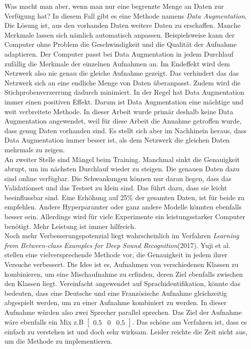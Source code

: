 Was macht man aber, wenn man nur eine begrenzte Menge an Daten zur Verfügung hat? In diesem Fall gibt es eine Methode namens \textit{Data Augmentation}. Die Lösung ist, aus den vorhanden Daten weitere Daten zu erschaffen. Manche Merkmale lassen sich nämlich automatisch anpassen. Beispielsweise kann der Computer ohne Problem die Geschwindigkeit und die Qualität der Aufnahme adaptieren. Der Computer passt bei Data Augmentation in jedem Durchlauf zufällig die Merkmale der einzelnen Aufnahmen an. Im Endeffekt wird dem Netzwerk also nie genau die gleiche Aufnahme gezeigt. Das verhindert das das Netzwerk sich an eine endliche Menge von Daten überanpasst. Zudem wird die Stichprobenverzerrung dadurch minimiert. In der Regel hat Data Augmentation immer einen positiven Effekt. Darum ist Data Augmentation  eine mächtige und weit verbreitete Methode.  In dieser Arbeit wurde primär deshalb keine Data Augmentation angewendet, weil für diese Arbeit die Annahme getroffen wurde, dass genug Daten vorhanden sind. Es stellt sich aber im Nachhinein heraus, dass Data Augmentation immer besser ist, als dem Netzwerk die gleichen Daten mehrmals zu zeigen. 
\\
An zweiter Stelle sind Mängel beim Training. Manchmal sinkt die Genauigkeit abrupt, um im nächsten Durchlauf wieder zu steigen. Die genauen Daten dazu sind online verfügbar. Die Schwankungen können nur daran liegen, dass das Validationset und das Testset zu klein sind. Das führt dazu, dass sie leicht beeinflussbar sind. Eine Erhöhung auf 25\% der gesamten Daten, ist für beide zu empfehlen. Andere Hyperparamter oder ganz andere Modelle könnten ebenfalls besser sein. Allerdings wird für viele Experimente ein leistungsstarker Computer benötigt. Mehr Leistung ist immer hilfreich.
\\
Noch mehr Verbesserungspotenzial liegt wahrscheinlich im Verfahren \textit{Learning from Between-class Examples for Deep Sound Recognition}(2017)\parencite{between}. Yuji et al. stellen eine vielversprechende Methode vor, die Genauigkeit in jedem ihrer Versuche verbessert. Die Idee ist es, Aufnahmen von verschiedenen Klassen zu kombinieren, um eine Mischaufnahme zu erfinden, deren Ziel ebenfalls zwischen den Klassen liegt. Vereinfacht angewendet auf Sprachidentifikation, könnte das bedeuten, dass eine Deutsche und eine Französische Aufnahme gleichzeitig abgespielt werden, um zu einer Aufnahme kombiniert zu werden. In dieser Aufnahme würden also zwei Sprecher parallel sprechen. Das Ziel der Aufnahme wäre ebenfalls ein Mix z.B $\begin{bmatrix}0.5 & 0 & 0.5 \end{bmatrix}$. Das schöne am Verfahren ist, dass es einfach zu verstehen ist und doch sehr wirksam. Leider reichte die Zeit nicht aus, um die Methode zu implementieren.

